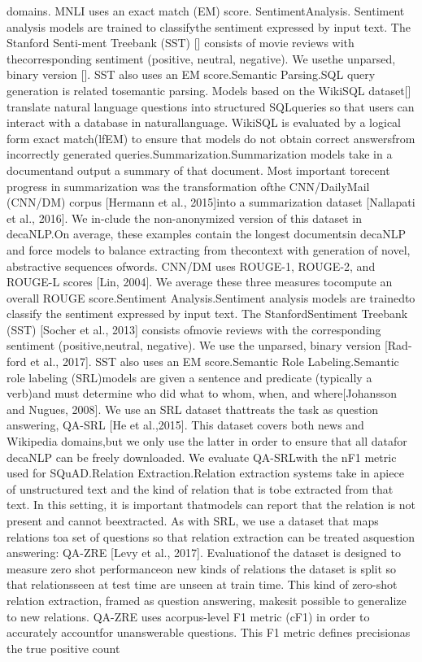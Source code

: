 domains.  MNLI  uses  an  exact  match  (EM)  score.  SentimentAnalysis.  Sentiment  analysis  models  are  trained  to  classifythe  sentiment  expressed  by  input  text.  The  Stanford  Senti-ment  Treebank  (SST)  []  consists  of  movie  reviews  with  thecorresponding  sentiment  (positive,  neutral,  negative).  We  usethe unparsed, binary version []. SST also uses an EM score.Semantic  Parsing.SQL  query  generation  is  related  tosemantic  parsing.  Models  based  on  the  WikiSQL  dataset[]  translate  natural  language  questions  into  structured  SQLqueries  so  that  users  can  interact  with  a  database  in  naturallanguage. WikiSQL is evaluated by a logical form exact match(lfEM)  to  ensure  that  models  do  not  obtain  correct  answersfrom incorrectly generated queries.Summarization.Summarization models take in a documentand  output  a  summary  of  that  document.  Most  important  torecent  progress  in  summarization  was  the  transformation  ofthe CNN/DailyMail (CNN/DM) corpus [Hermann et al., 2015]into  a  summarization  dataset  [Nallapati  et  al.,  2016].  We  in-clude the non-anonymized version of this dataset in decaNLP.On  average,  these  examples  contain  the  longest  documentsin decaNLP and force models to balance extracting from thecontext  with  generation  of  novel,  abstractive  sequences  ofwords.  CNN/DM  uses  ROUGE-1,  ROUGE-2,  and  ROUGE-L  scores  [Lin,  2004].  We  average  these  three  measures  tocompute an overall ROUGE score.Sentiment Analysis.Sentiment analysis models are trainedto classify the sentiment expressed by input text. The StanfordSentiment  Treebank  (SST)  [Socher  et  al.,  2013]  consists  ofmovie  reviews  with  the  corresponding  sentiment  (positive,neutral, negative). We use the unparsed, binary version [Rad-ford et al., 2017]. SST also uses an EM score.Semantic  Role  Labeling.Semantic  role  labeling  (SRL)models  are  given  a  sentence  and  predicate  (typically  a  verb)and must determine who did what to whom, when, and where[Johansson  and  Nugues,  2008].  We  use  an  SRL  dataset  thattreats  the  task  as  question  answering,  QA-SRL  [He  et  al.,2015]. This dataset covers both news and Wikipedia domains,but  we  only  use  the  latter  in  order  to  ensure  that  all  datafor decaNLP can be freely downloaded. We evaluate QA-SRLwith the nF1 metric used for SQuAD.Relation Extraction.Relation extraction systems take in apiece  of  unstructured  text  and  the  kind  of  relation  that  is  tobe extracted from that text. In this setting, it is important thatmodels can report that the relation is not present and cannot beextracted. As with SRL, we use a dataset that maps relations toa set of questions so that relation extraction can be treated asquestion answering: QA-ZRE [Levy et al., 2017]. Evaluationof  the  dataset  is  designed  to  measure  zero  shot  performanceon new kinds of relations   the dataset is split so that relationsseen  at  test  time  are  unseen  at  train  time.  This  kind  of  zero-shot relation extraction, framed as question answering, makesit  possible  to  generalize  to  new  relations.  QA-ZRE  uses  acorpus-level  F1  metric  (cF1)  in  order  to  accurately  accountfor unanswerable  questions. This F1  metric  defines precisionas  the  true  positive  count 